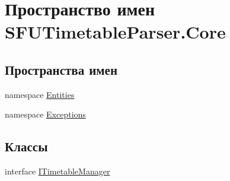 \hypertarget{namespace_s_f_u_timetable_parser_1_1_core}{}\section{Пространство имен S\+F\+U\+Timetable\+Parser.\+Core}
\label{namespace_s_f_u_timetable_parser_1_1_core}
\subsection*{Пространства имен}
\begin{DoxyCompactItemize}
\item 
namespace \hyperlink{namespace_s_f_u_timetable_parser_1_1_core_1_1_entities}{Entities}
\item 
namespace \hyperlink{namespace_s_f_u_timetable_parser_1_1_core_1_1_exceptions}{Exceptions}
\end{DoxyCompactItemize}
\subsection*{Классы}
\begin{DoxyCompactItemize}
\item 
interface \hyperlink{interface_s_f_u_timetable_parser_1_1_core_1_1_i_timetable_manager}{I\+Timetable\+Manager}
\end{DoxyCompactItemize}
